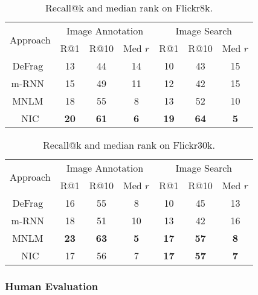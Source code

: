 \begin{table}
\centering
\begin{small}
\setlength{\tabcolsep}{3pt}
\begin{tabular}{|c|ccc|ccc|}
 \hline
\multirow{2}{*}{Approach} & \multicolumn{3}{c|}{Image Annotation} & \multicolumn{3}{c|}{Image Search} \\
 & R@1 & R@10 & Med $r$ &  R@1 & R@10 & Med $r$ \\
\hline
\hline
DeFrag~\cite{karpathy2014deep} & 13 & 44 & 14             &    10 & 43 & 15  \\
m-RNN~\cite{baidu2014}         &  15 & 49 & 11               &  12 & 42 & 15\\
MNLM~\cite{kiros2014}        &  18   & 55 & 8        &  13 & 52 & 10   \\
\hline
NIC                            &  \bf{20} & \bf{61} & \bf{6}              &    \bf{19} & \bf{64} & \bf{5} \\
\hline
\end{tabular}
\end{small}
\caption{Recall@k and median rank on Flickr8k.\label{tab:recall@10}}
\end{table}

\begin{table}
\centering
\begin{small}
\setlength{\tabcolsep}{3pt}
\begin{tabular}{|c|ccc|ccc|}
\hline
\multirow{2}{*}{Approach} & \multicolumn{3}{c|}{Image Annotation} & \multicolumn{3}{c|}{Image Search} \\
 & R@1 & R@10 & Med $r$ &  R@1 & R@10 & Med $r$ \\
\hline
\hline
DeFrag~\cite{karpathy2014deep} & 16 & 55 & 8             &    10 & 45 & 13  \\
m-RNN~\cite{baidu2014}         &  18 & 51 & 10               &  13 & 42 & 16\\
MNLM~\cite{kiros2014}        &  \bf{23}   & \bf{63} & \bf{5}        &  \bf{17} & \bf{57} & \bf{8}   \\
\hline
NIC                            &  17 & 56  & 7               &    \bf{17} & \bf{57} & \bf{7} \\
\hline
\end{tabular}
\end{small}
\caption{Recall@k and median rank on Flickr30k.\label{tab:recall@1030k}}
\end{table}


\subsubsection{Human Evaluation}
\label{sec:human}

